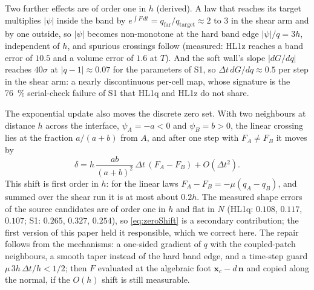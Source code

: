 \documentclass[preprint,3p,11pt]{elsarticle}
\newcommand{\psilev}{\psi}
\newcommand{\nhat}{\mathbf{n}}
\newcommand{\bx}{\mathbf{x}}
\begin{document}
Two further effects are of order one in $h$ (derived). A law that reaches its target
multiplies $|\psilev|$ inside the band by $e^{\int F\,dt}=q_\mathrm{far}/q_\mathrm{target}
\approx2$ to $3$ in the shear arm and by one outside, so $|\psilev|$ becomes non-monotone
at the hard band edge $|\psilev|/q=3h$, independent of $h$, and spurious crossings
follow (measured: HL1z reaches a band error of $10.5$ and a volume error of $1.6$ at
$T$). And the soft wall's slope $|dG/dq|$ reaches $40\sigma$ at $|q-1|\approx0.07$ for
the parameters of S1, so $\Delta t\,dG/dq\approx0.5$ per step in the shear arm: a nearly
discontinuous per-cell map, whose signature is the \SI{76}{\percent} serial-check
failure of S1 that HL1q and HL1z do not share.

The exponential update also moves the discrete zero set. With two neighbours at
distance $h$ across the interface, $\psilev_A=-a<0$ and $\psilev_B=b>0$, the linear
crossing lies at the fraction $a/(a+b)$ from $A$, and after one step with $F_A\neq F_B$
it moves by
\begin{equation}
  \delta = h\,\frac{ab}{(a+b)^2}\,\Delta t\,(F_A-F_B)+O(\Delta t^2).
  \label{eq:zeroShift}
\end{equation}
This shift is first order in $h$: for the linear laws $F_A-F_B=-\mu(q_A-q_B)$, and
summed over the shear run it is at most about $0.2h$. The measured shape errors of the
source candidates are of order one in $h$ and flat in $N$ (HL1q: $0.108$, $0.117$,
$0.107$; S1: $0.265$, $0.327$, $0.254$), so \eqref{eq:zeroShift} is a secondary
contribution; the first version of this paper held it responsible, which we correct
here. The repair follows from the mechanisms: a one-sided gradient of $q$ with the
coupled-patch neighbours, a smooth taper instead of the hard band edge, and a
time-step guard $\mu\,3h\,\Delta t/h<1/2$; then $F$ evaluated at the algebraic foot
$\bx_c-d\,\nhat$ and copied along the normal, if the $O(h)$ shift is still measurable.
\end{document}
